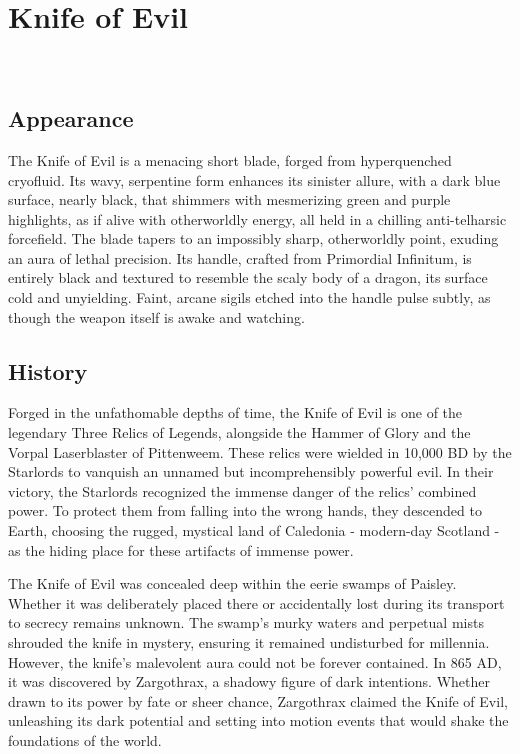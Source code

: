 \ItemCategory{}
\ItemSubCategory{}
\ItemFolder{}

\chapter*{Knife of Evil}
\\

%
	
\section*{Appearance}
{\entryfont The Knife of Evil is a menacing short blade, forged from hyperquenched cryofluid. Its wavy, serpentine form enhances its sinister allure, with a dark blue surface, nearly black, that shimmers with mesmerizing green and purple highlights, as if alive with otherworldly energy, all held in a chilling anti-telharsic forcefield. The blade tapers to an impossibly sharp, otherworldly point, exuding an aura of lethal precision. Its handle, crafted from Primordial Infinitum, is entirely black and textured to resemble the scaly body of a dragon, its surface cold and unyielding. Faint, arcane sigils etched into the handle pulse subtly, as though the weapon itself is awake and watching.}

\section*{History}
{\entryfont Forged in the unfathomable depths of time, the Knife of Evil is one of the legendary Three Relics of Legends, alongside the Hammer of Glory and the Vorpal Laserblaster of Pittenweem. These relics were wielded in 10,000 BD by the Starlords to vanquish an unnamed but incomprehensibly powerful evil. In their victory, the Starlords recognized the immense danger of the relics' combined power. To protect them from falling into the wrong hands, they descended to Earth, choosing the rugged, mystical land of Caledonia - modern-day Scotland - as the hiding place for these artifacts of immense power.

The Knife of Evil was concealed deep within the eerie swamps of Paisley. Whether it was deliberately placed there or accidentally lost during its transport to secrecy remains unknown. The swamp's murky waters and perpetual mists shrouded the knife in mystery, ensuring it remained undisturbed for millennia. However, the knife's malevolent aura could not be forever contained. In 865 AD, it was discovered by Zargothrax, a shadowy figure of dark intentions. Whether drawn to its power by fate or sheer chance, Zargothrax claimed the Knife of Evil, unleashing its dark potential and setting into motion events that would shake the foundations of the world.}

